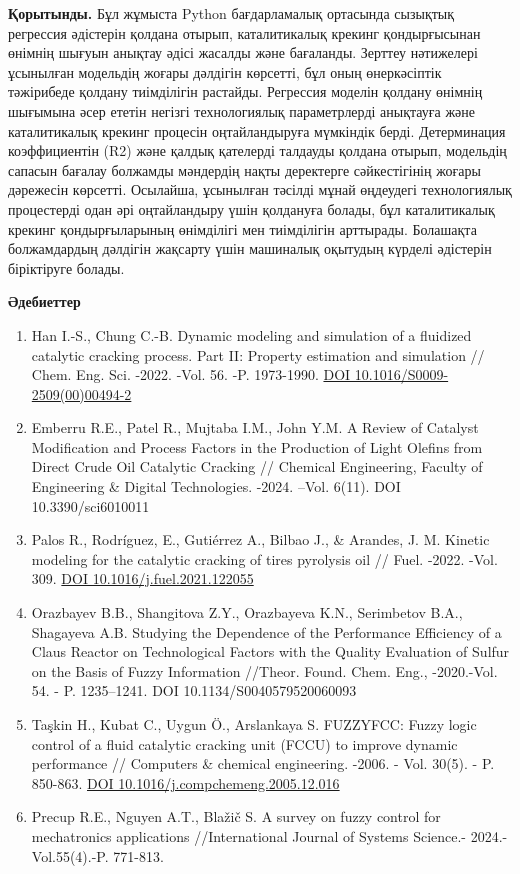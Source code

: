{\bfseries Қорытынды.} Бұл жұмыста Python бағдарламалық ортасында сызықтық
регрессия әдістерін қолдана отырып, каталитикалық крекинг қондырғысынан
өнімнің шығуын анықтау әдісі жасалды және бағаланды. Зерттеу нәтижелері
ұсынылған модельдің жоғары дәлдігін көрсетті, бұл оның өнеркәсіптік
тәжірибеде қолдану тиімділігін растайды. Регрессия моделін қолдану
өнімнің шығымына әсер ететін негізгі технологиялық параметрлерді
анықтауға және каталитикалық крекинг процесін оңтайландыруға мүмкіндік
берді. Детерминация коэффициентін (R2) және қалдық қателерді талдауды
қолдана отырып, модельдің сапасын бағалау болжамды мәндердің нақты
деректерге сәйкестігінің жоғары дәрежесін көрсетті. Осылайша, ұсынылған
тәсілді мұнай өңдеудегі технологиялық процестерді одан әрі оңтайландыру
үшін қолдануға болады, бұл каталитикалық крекинг қондырғыларының
өнімділігі мен тиімділігін арттырады. Болашақта болжамдардың дәлдігін
жақсарту үшін машиналық оқытудың күрделі әдістерін біріктіруге болады.

{\bfseries Әдебиеттер}

\begin{enumerate}
\def\labelenumi{\arabic{enumi}.}
\item
  Han I.-S., Chung C.-B. Dynamic modeling and simulation of a fluidized
  catalytic cracking process. Part II: Property estimation and
  simulation // Chem. Eng. Sci. -2022. -Vol. 56. -P. 1973-1990.
  \href{https://doi.org/10.1016/S0009-2509(00)00494-2}{DOI
  10.1016/S0009-2509(00)00494-2}
\item
  Emberru R.E., Patel R., Mujtaba I.M., John Y.M. A Review of Catalyst
  Modification and Process Factors in the Production of Light Olefins
  from Direct Crude Oil Catalytic Cracking // Chemical Engineering,
  Faculty of Engineering \& Digital Technologies. -2024. --Vol. 6(11).
  DOI 10.3390/sci6010011
\item
  Palos R., Rodríguez, E., Gutiérrez A., Bilbao J., \& Arandes, J. M.
  Kinetic modeling for the catalytic cracking of tires pyrolysis oil //
  Fuel. -2022. -Vol. 309.
  \href{https://doi.org/10.1016/j.fuel.2021.122055}{DOI
  10.1016/j.fuel.2021.122055}
\item
  Orazbayev B.B., Shangitova Z.Y., Orazbayeva K.N., Serimbetov B.A.,
  Shagayeva A.B. Studying the Dependence of the Performance Efficiency
  of a Claus Reactor on Technological Factors with the Quality
  Evaluation of Sulfur on the Basis of Fuzzy Information //Theor. Found.
  Chem. Eng., -2020.-Vol. 54. - P. 1235--1241. DOI
  10.1134/S0040579520060093
\item
  Taşkin H., Kubat C., Uygun Ö., Arslankaya S. FUZZYFCC: Fuzzy logic
  control of a fluid catalytic cracking unit (FCCU) to improve dynamic
  performance // Computers \& chemical engineering. -2006. - Vol. 30(5).
  - P. 850-863.
  \href{https://doi.org/10.1016/j.compchemeng.2005.12.016}{DOI
  10.1016/j.compchemeng.2005.12.016}
\item
  Precup R.E., Nguyen A.T., Blažič S. A survey on fuzzy control for
  mechatronics applications //International Journal of Systems Science.-
  2024.- Vol.55(4).-P. 771-813.
\end{enumerate}

